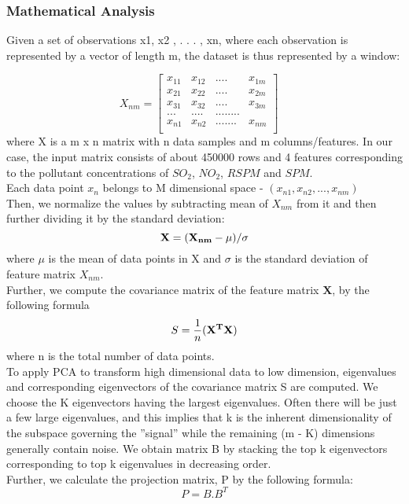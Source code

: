 \documentclass{article}
\begin{document}
\subsubsection {\color{brown} \textbf{Mathematical Analysis}}
Given a set of observations x1, x2 , . . . , xn, where each
observation is represented by a vector of length m, the
dataset is thus represented by a window: 

\begin{equation} X_{nm} = 
\begin{bmatrix} 
x_{11} & x_{12} & .... & x_{1m} \\
x_{21} & x_{22} & .... & x_{2m}\\
x_{31} & x_{32} & .... & x_{3m} \\
... & .... & ....    .... \\
x_{n1} & x_{n2} & .......& x_{nm} \\
\end{bmatrix}
\quad
\end{equation}
where X is a m x n matrix with n data samples and m columns/features. In our case, the input matrix consists of about 450000 rows and 4 features corresponding to the pollutant concentrations of $SO_2$, $NO_2$, $RSPM$ and $SPM$. \\
Each data point $x_{n}$ belongs to M dimensional space - $(x_{n1}, x_{n2}, ..., x_{nm})$ \\
Then, we normalize the values by subtracting mean of $X_{nm}$ from it and then further dividing it by the standard deviation: 
      \begin{equation*}
	  \bold{X = (X_{nm} - \mu) / \sigma}
	  \end{equation*}
	  where $\mu$ is the mean of data points in X and $\sigma$ is the standard deviation of feature matrix $X_{nm}$. \\ 
	  
Further, we compute the covariance matrix of the feature matrix $\textbf{X}$, by the following formula \\
 \begin{equation*}
                S = \frac{1}{n}\bold{(X^TX)}
            \end{equation*}
where n is the total number of data points. \\
	  
To apply PCA to transform high dimensional data to low dimension, eigenvalues and corresponding eigenvectors of the covariance matrix S are computed. We choose the K eigenvectors having the largest eigenvalues. Often there will be just a few large eigenvalues, and this implies that k is the inherent dimensionality of the subspace governing the ”signal” while the remaining (m - K) dimensions generally contain noise. We obtain matrix B by stacking the top k eigenvectors corresponding to top k eigenvalues in decreasing order. \\ Further, we calculate the projection matrix, P by the following formula:
   \begin{equation*}
                P = B.B^T
    \end{equation*}
\end{document}
